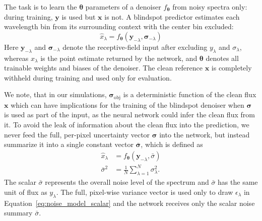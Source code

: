 \documentclass[twocolumn]{aastex7}
\newcommand{\ld}[1]{\textcolor{red}{\textbf{#1}}}
\newcommand{\m}[1]{\boldsymbol{#1}}
\begin{document}
The task is to learn the $\m{\theta}$ parameters of a denoiser $f_{\m{\theta}}$ from noisy spectra only: during training, $\m{y}$ is used but $\m{x}$ is not. A blindspot predictor estimates each wavelength bin from its surrounding context with the center bin excluded:
\begin{equation}
    \hat{x}_{\lambda} 
        = f_{\m{\theta}}(\m{y}_{-\lambda},\m{\sigma}_{-\lambda})
\end{equation}
Here $\m{y}_{-\lambda}$ and $\m{\sigma}_{-\lambda}$ denote the receptive-field input after excluding $y_{\lambda}$ and $\sigma_{\lambda}$, whereas $\hat{x}_{\lambda}$ is the point estimate returned by the network, and $\m{\theta}$ denotes all trainable weights and biases of the denoiser. The clean reference $\m{x}$ is completely withheld during training and used only for evaluation.

We note, that in our simulations, $\m{\sigma}_{\mathrm{obj}}$ is a deterministic function of the clean flux $\m{x}$ which can have implications for the training of the blindspot denoiser when $\m{\sigma}$ is used as part of the input, as the neural network could infer the clean flux from it. To avoid the leak of information about the clean flux into the prediction, we never feed the full, per-pixel uncertainty vector $\m{\sigma}$ into the network, but instead summarize it into a single constant vector $\bar{\m{\sigma}}$, which is defined as
\begin{align}
    \hat{x}_{\lambda} 
        &= f_{\m{\theta}}(\m{y}_{-\lambda},\bar{\sigma})
        \label{eq:blindspot_prediction} \\
    \bar{\sigma}^2
        &= \frac{1}{N}\sum_{\lambda=1}^{N}\sigma_{\lambda}^{2}.
        \label{eq:noise_summary}
\end{align}
The scalar $\bar{\sigma}$ represents the overall noise level of the spectrum and $\bar{\sigma}$ has the same unit of flux as $y_{\lambda}$.
The full, pixel-wise variance vector is used only to draw $\epsilon_{\lambda}$ in Equation~\ref{eq:noise_model_scalar} and the network receives only the scalar noise summary $\bar{\sigma}$.

\end{document}
